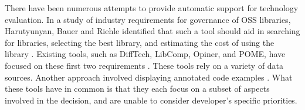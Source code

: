 
There have been numerous attempts to provide automatic support for technology evaluation. In a study of industry requirements for governance of OSS libraries, Harutyunyan, Bauer and Riehle identified that such a tool should aid in searching for libraries, selecting the best library, and estimating the cost of using the library \cite{harutyunyan:2018:understanding}. Existing tools, such as DiffTech, LibComp, Opiner, and POME, have focused on these first two requirements \cite{huang2018tell, wang2020difftech, wang2021difftech,de2018library, de2018empirical, el2020libcomp,uddin2019automatic, uddin2022empirical,lin2019pattern}. 
These tools rely on a variety of data sources. Another approach involved displaying annotated code examples \cite{yan2022concept}. What these tools have in common is that they each focus on a subset of aspects involved in the decision, and are unable to consider developer's specific priorities.

